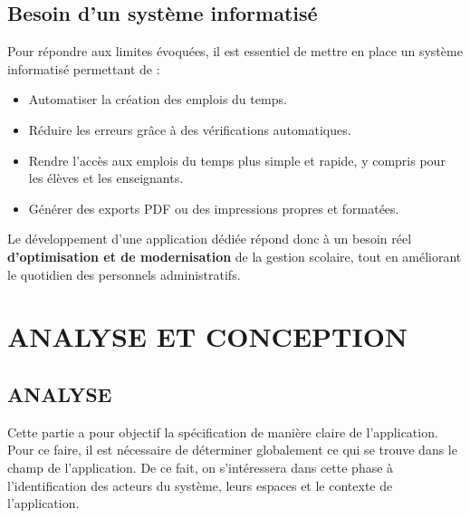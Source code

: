 \documentclass[english,12pt,a4paper]{report}
\begin{document}
\section{Besoin d’un système informatisé}
Pour répondre aux limites évoquées, il est essentiel de mettre en place un système informatisé permettant de :
\begin{itemize}
	\item Automatiser la création des emplois du temps.
	\item Réduire les erreurs grâce à des vérifications automatiques.
	\item Rendre l’accès aux emplois du temps plus simple et rapide, y compris pour les élèves et les enseignants.
	\item Générer des exports PDF ou des impressions propres et formatées.
\end{itemize}
Le développement d’une application dédiée répond donc à un besoin réel \textbf{d’optimisation et de modernisation} de la gestion scolaire, tout en améliorant le quotidien des personnels administratifs.

\chapter{ANALYSE ET CONCEPTION}
\section{ANALYSE}
Cette partie a pour objectif la spécification de manière claire de l’application. Pour ce faire, il est nécessaire de déterminer globalement ce qui se trouve dans le champ de l’application. De ce fait, on s’intéressera dans cette phase à l’identification des acteurs du système, leurs espaces et le contexte de l’application.
\end{document}
